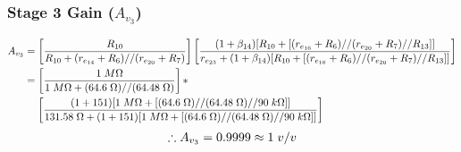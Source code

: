 \documentclass{article}
\begin{document}
	\subsubsection*{Stage 3 Gain ($A_{v_3}$)}
	\begin{align*}
		A_{v_3} &= \left[\frac{R_{10}}{R_{10} + (r_{e_{14}} + R_6) // (r_{e_{20}} + R_7)}\right] \left[\frac{(1 + \beta_{14}) [R_{10} + [(r_{e_{16}} + R_6) // (r_{e_{20}} + R_7) // R_{13}]]}{r_{e_{23}} + (1 + \beta_{14}) [R_{10} + [(r_{e_{16}} + R_6) // (r_{e_{20}} + R_7) // R_{13}]]} \right]\\
		&= \left[\frac{1 \hspace{1mm} M\Omega}{1 \hspace{1mm} M\Omega + (64.6 \hspace{1mm} \Omega) // (64.48 \hspace{1mm} \Omega)}\right] *\\
		& \hspace{4mm} \left[\frac{(1 + 151)[1 \hspace{1mm} M\Omega + [(64.6 \hspace{1mm} \Omega) // (64.48 \hspace{1mm} \Omega) // 90 \hspace{1mm} k\Omega]]}{131.58 \hspace{1mm} \Omega + (1 + 151)[1 \hspace{1mm} M\Omega + [(64.6 \hspace{1mm} \Omega) // (64.48 \hspace{1mm} \Omega) // 90 \hspace{1mm} k\Omega]]}\right]
	\end{align*}
	\begin{align*}
		\therefore A_{v_3} = 0.9999 \approx 1 \hspace{1mm} v/v
	\end{align*}
\end{document}
